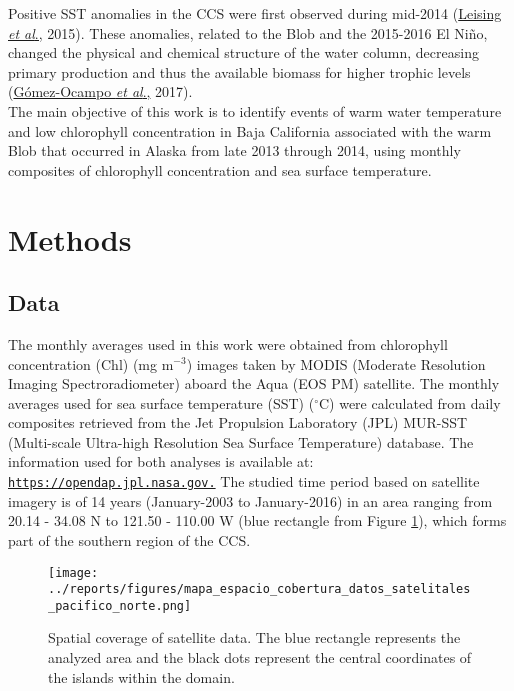 \documentclass{article} %
\begin{document}
Positive SST anomalies in the CCS were first observed during mid-2014 (\hyperlink{leising}{Leising \textit{et al}.,} 2015). These anomalies, related to the Blob and the 2015-2016 El Niño, changed the physical and chemical structure of the water column, decreasing primary production and thus the available biomass for higher trophic levels (\hyperlink{gomez}{Gómez-Ocampo \textit{et al}.,} 2017).\\

The main objective of this work is to identify events of warm water temperature and low chlorophyll concentration in Baja California associated with the warm Blob that occurred in Alaska from late 2013 through 2014, using monthly composites of chlorophyll concentration and sea surface temperature.\\

\section{Methods}
\subsection{Data}

The monthly averages used in this work were obtained from chlorophyll concentration (Chl) (mg m$^{-3}$) images taken by MODIS (Moderate Resolution Imaging Spectroradiometer) aboard the Aqua (EOS PM) satellite. The monthly averages used for sea surface temperature (SST) ($^{\circ}$C) were calculated from daily composites retrieved from the Jet Propulsion Laboratory (JPL) MUR-SST (Multi-scale Ultra-high Resolution Sea Surface Temperature) database. The information used for both analyses is available at: \href{https://opendap.jpl.nasa.gov.}{\texttt{https://opendap.jpl.nasa.gov.}} The studied time period based on satellite imagery is of 14 years (January-2003 to January-2016) in an area ranging from 20.14 - 34.08 N to 121.50 - 110.00 W (blue rectangle from Figure \ref{fig:satellite}), which forms part of the southern region of the CCS.



\begin{figure}
  \begin{center}
  \texttt{[image: ../reports/figures/mapa\_espacio\_cobertura\_datos\_satelitales\_pacifico\_norte.png]}
  \caption{Spatial coverage of satellite data. The blue rectangle represents the analyzed area and the black dots represent the central coordinates of the islands within the domain.}
  \label{fig:satellite}
  \end{center}
\end{figure}
\end{document}
